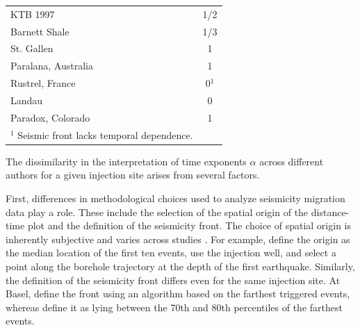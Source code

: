 \documentclass[draft]{agujournal2019}
\begin{document}
\begin{table}[htbp]
\begin{tabular}{llc}
		\midrule
		KTB 1997                          & \cite{ShapiroEtAl1997}   & 1/2                     \\
		Barnett Shale                     & \cite{ShapiroDinske2009} & 1/3                     \\
		St. Gallen                        & \cite{GoebelBrodsky2018} & 1                       \\
		Paralana, Australia               & \cite{GoebelBrodsky2018} & 1                       \\
		Rustrel, France                   & \cite{GoebelBrodsky2018} & 0$^1$                   \\
		Landau                            & \cite{GoebelBrodsky2018} & 0                       \\
		Paradox, Colorado                 & \cite{GoebelBrodsky2018} & 1                       \\
		\bottomrule
		\multicolumn{2}{l}{$^1$ Seismic front lacks temporal dependence.}
	\end{tabular}
\end{table}


The dissimilarity in the interpretation of time exponents $\alpha$ across different authors for a given injection site arises from several factors.

First, differences in methodological choices used to analyze seismicity migration data play a role. These include the selection of the spatial origin of the distance-time plot and the definition of the seismicity front. The choice of spatial origin is inherently subjective and varies across studies \cite{DeBarrosEtAl2021}. For example,  define the origin as the median location of the first ten events,  use the injection well, and  select a point along the borehole trajectory at the depth of the first earthquake. Similarly, the definition of the seismicity front differs even for the same injection site. At Basel,  define the front using an algorithm based on the farthest triggered events, whereas  define it as lying between the 70th and 80th percentiles of the farthest events.
\end{document}
